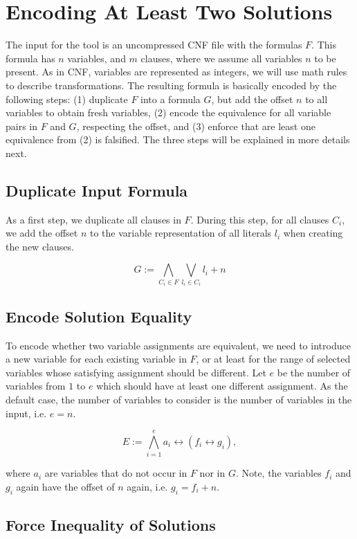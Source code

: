 \documentclass[conference]{IEEEtran}
\begin{document}
\section{Encoding At Least Two Solutions}

The input for the \ALT tool is an uncompressed CNF file with the formulas $F$.
This formula has $n$ variables, and $m$ clauses, where we assume all variables $n$ to be present.
As in CNF, variables are represented as integers, we will use math rules to describe transformations.
The resulting formula is basically encoded by the following steps:
(1) duplicate $F$ into a formula $G$, but add the offset $n$ to all variables to obtain fresh variables,
(2) encode the equivalence for all variable pairs in $F$ and $G$, respecting the offset, and
(3) enforce that are least one equivalence from (2) is falsified.
The three steps will be explained in more details next.

\subsection{Duplicate Input Formula}

As a first step, we duplicate all clauses in $F$.
During this step, for all clauses $C_i$, we add the offset $n$ to the variable representation of all literals $l_i$ when creating the new clauses.

\[G := \bigwedge_{C_i \in F} \bigvee_{l_i \in C_i} l_i + n \]

\subsection{Encode Solution Equality}

To encode whether two variable assignments are equivalent, we need to introduce a new variable for each existing variable in $F$, or at least for the range of selected variables whose satisfying assignment should be different.
Let $e$ be the number of variables from $1$ to $e$ which should have at least one different assignment.
As the default case, the number of variables to consider is the number of variables in the input, i.e. $e = n$.

\[E := \bigwedge_{i=1}^{e} a_i \leftrightarrow (f_i \leftrightarrow g_i), \]

\noindent
where $a_i$ are variables that do not occur in $F$ nor in $G$.
Note, the variables $f_i$ and $g_i$ again have the offset of $n$ again, i.e. $g_i = f_i +n$.

\subsection{Force Inequality of Solutions}
\end{document}
